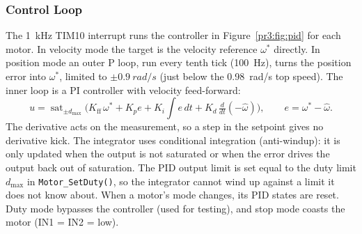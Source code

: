 \documentclass[12pt,a4paper]{article}
\begin{document}
\subsubsection{Control Loop}

The \SI{1}{kHz} TIM10 interrupt runs the controller in Figure~\ref{pr3:fig:pid} for each motor.
In velocity mode the target is the velocity reference $\omega^*$ directly. In position mode
an outer P loop, run every tenth tick (\SI{100}{Hz}), turns the position error into
$\omega^*$, limited to $\pm\SI{0.9}{rad/s}$ (just below the \SI{0.98}{rad/s} top speed).
The inner loop is a PI controller with velocity feed-forward:
\begin{equation}
  u = \operatorname{sat}_{\pm d_\text{max}}\!\Big(K_\text{ff}\,\omega^* + K_p e + K_i\!\int e\,dt + K_d\,\tfrac{d}{dt}(-\hat\omega)\Big),
  \qquad e = \omega^*-\hat\omega .
\end{equation}
The derivative acts on the measurement, so a step in the setpoint gives no derivative kick.
The integrator uses conditional integration (anti-windup): it is only updated when the output
is not saturated or when the error drives the output back out of saturation. The PID output
limit is set equal to the duty limit $d_\text{max}$ in \texttt{Motor\_SetDuty()}, so the
integrator cannot wind up against a limit it does not know about. When a motor's mode
changes, its PID states are reset. Duty mode bypasses the controller (used for testing),
and stop mode coasts the motor (IN1 = IN2 = low).
\end{document}
